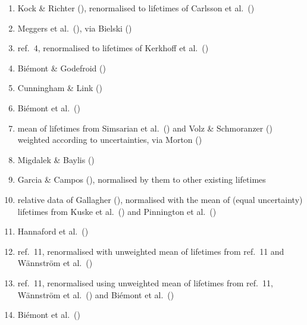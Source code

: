 \documentclass[traditabstract]{aa}
\begin{document}
\begin{minipage}[t]{0.43\linewidth}
\vspace{0pt}
\begin{enumerate}
\item Kock \& Richter (\cite{kock}), renormalised to lifetimes of Carlsson et al.\ (\cite{carl})
\item Meggers et al.\ (\cite{Meggers61}), via Bielski (\cite{biel})
\item ref.\ 4, renormalised to lifetimes of Kerkhoff et al.\ (\cite{Kerkhoff80}) 
\item Bi\'{e}mont \& Godefroid (\cite{biem8})
\item Cunningham \& Link (\cite{Cunningham67})
\item Bi\'emont et al.\ (\cite{biem2})
\item mean of lifetimes from Simsarian et al.\ (\cite{sim}) and Volz \& Schmoranzer (\cite{vol}) weighted according to uncertainties, via Morton (\cite{Morton00})  
\item Migdalek \& Baylis (\cite{Migdalek})
\item Garcia \& Campos (\cite{garc}), normalised by them to other existing lifetimes
\item relative data of Gallagher (\cite{Gallagher}), normalised with the mean of (equal uncertainty) lifetimes from Kuske et al.\ (\cite{Kuske}) and Pinnington et al.\ (\cite{Pinnington95})
\item Hannaford et al.\ (\cite{hann1})
\item ref.\ 11, renormalised with unweighted mean of lifetimes from ref.\ 11 and W\"annstr\"om et al.\ (\cite{wann})
\item ref.\ 11, renormalised using unweighted mean of lifetimes from ref.\ 11, W\"annstr\"om et al.\ (\cite{wann}) and Bi\'{e}mont et al.\ (\cite{biem7})
\item Bi\'emont et al.\ (\cite{biem3})
\end{enumerate}
\end{minipage}%
\begin{minipage}[t]{0.05\linewidth}
\vspace{0pt}
\hspace{3mm}
\end{minipage}%
\end{document}
